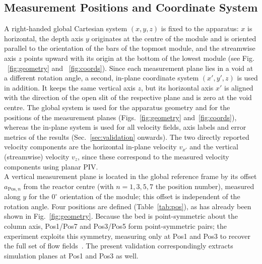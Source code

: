 

\subsection{Measurement Positions and Coordinate System}
\label{sec:geometry:coords}
A right-handed global Cartesian system $(x,y,z)$ is fixed to the apparatus: $x$ is horizontal, the depth axis $y$ originates at the centre of the module and is oriented parallel to the orientation of the bars of the topmost module, and the streamwise axis $z$ points upward with its origin at the bottom of the lowest module (see Fig. ~\ref{fig:geometry} and ~\ref{fig:coords}). Since each measurement plane lies in a void at a different rotation angle, a second, in-plane coordinate system $(x',y',z)$ is used in addition. It keeps the same vertical axis $z$, but its horizontal axis $x'$ is aligned with the direction of the open slit of the respective plane and is zero at the void centre. The global system is used for the apparatus geometry and for the positions of the measurement planes (Figs.~\ref{fig:geometry} and~\ref{fig:coords}), whereas the in-plane system is used for all velocity fields, axis labels and error metrics of the results (Sec.~\ref{sec:validation} onwards). The two directly reported velocity components are the horizontal in-plane velocity $v_{x'}$ and the vertical (streamwise) velocity $v_z$, since these correspond to the measured velocity components using planar PIV.\\
A vertical measurement plane is located in the global reference frame by its offset $a_{\mathrm{Pos},n}$ from the reactor centre (with $n=1,3,5,7$ the position number), measured along $y$ for the $0^\circ$ orientation of the module; this offset is independent of the rotation angle. Four positions are defined (Table~\ref{tab:pos}), as has already been shown in Fig.~\ref{fig:geometry}. Because the bed is point-symmetric about the column axis, Pos1/Pos7 and Pos3/Pos5 form point-symmetric pairs; the experiment exploits this symmetry, measuring only at Pos1 and Pos3 to recover the full set of flow fields~\cite{velten2026}. The present validation correspondingly extracts simulation planes at Pos1 and Pos3 as well.

